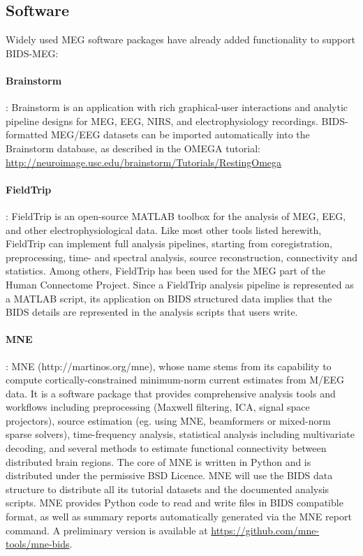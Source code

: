 \subsection{Software}
Widely used MEG software packages have already added functionality to support BIDS-MEG:

\paragraph{Brainstorm}\citep{tadel2011brainstorm}: Brainstorm is an application with rich graphical-user interactions and analytic pipeline designs for MEG, EEG, NIRS, and electrophysiology recordings. BIDS-formatted MEG/EEG datasets can be imported automatically into the Brainstorm database, as described in the OMEGA tutorial: \url{http://neuroimage.usc.edu/brainstorm/Tutorials/RestingOmega}

\paragraph{FieldTrip}\citep{oostenveld2010fieldtrip}: FieldTrip is an open-source MATLAB toolbox for the analysis of MEG, EEG, and other electrophysiological data. Like most other tools listed herewith, FieldTrip can  implement full analysis pipelines, starting from coregistration, preprocessing, time- and spectral analysis, source reconstruction, connectivity and statistics. Among others, FieldTrip has been used for the MEG part of the Human Connectome Project. Since a FieldTrip analysis pipeline is represented as a MATLAB script, its application on BIDS structured data implies that the BIDS details are represented in the analysis scripts that users write. 

\paragraph{MNE}\citep{gramfort2013meg, mne}: MNE (http://martinos.org/mne), whose name stems from its capability to compute cortically-constrained minimum-norm current estimates from M/EEG data. It is a software package that provides comprehensive analysis tools and workflows including preprocessing (Maxwell filtering, ICA, signal space projectors), source estimation (eg. using MNE, beamformers or mixed-norm sparse solvers), time-frequency analysis, statistical analysis including multivariate decoding, and several methods to estimate functional connectivity between distributed brain regions. The core of MNE is written in Python and is distributed under the permissive BSD Licence. MNE will use the BIDS data structure to distribute all its tutorial datasets and the documented analysis scripts. MNE provides Python code to read and write files in BIDS compatible format, as well as summary reports automatically generated via the MNE report command. A preliminary version is available at \url{https://github.com/mne-tools/mne-bids}. 

